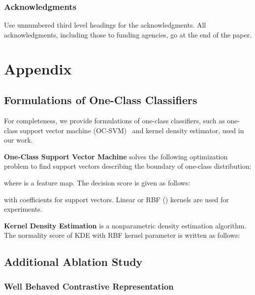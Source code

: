 \documentclass{article} \usepackage{iclr2021_conference,times}
\begin{document}
\subsubsection*{Acknowledgments}
Use unnumbered third level headings for the acknowledgments. All
acknowledgments, including those to funding agencies, go at the end of the paper.
\fi

\newpage



\newpage
\appendix
\section{Appendix}

\subsection{Formulations of One-Class Classifiers}
\label{sec:supp_classifier_formulation}
For completeness, we provide formulations of one-class classifiers, such as one-class support vector machine (OC-SVM)~\citep{scholkopf2000support} and kernel density estimator, used in our work.  

\textbf{One-Class Support Vector Machine} solves the following optimization problem to find support vectors describing the boundary of one-class distribution:

where  is a feature map. The decision score is given as follows:

with coefficients  for support vectors.
Linear or RBF () kernels are used for experiments.

\textbf{Kernel Density Estimation} is a nonparametric density estimation algorithm. The normality score of KDE with RBF kernel parameter  is written as follows:






\subsection{Additional Ablation Study}
\label{sec:supp_ablation}

\subsubsection{Well Behaved Contrastive Representation}
\label{sec:supp_ablation_linear_separability}
\end{document}
